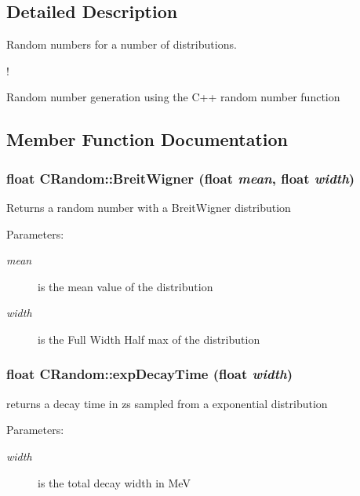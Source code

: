 \subsection{Detailed Description}
Random numbers for a number of distributions. 

!

Random number generation using the C++ random number function 



\subsection{Member Function Documentation}
\subsubsection{\setlength{\rightskip}{0pt plus 5cm}float CRandom::Breit\-Wigner (float {\em mean}, float {\em width})\hspace{0.3cm}{\tt  [static]}}\label{classCRandom_884f885e1cf081106f27a8ea25f14362}


Returns a random number with a Breit\-Wigner distribution \begin{Desc}
\item[Parameters:]
\begin{description}
\item[{\em mean}]is the mean value of the distribution \item[{\em width}]is the Full Width Half max of the distribution \end{description}
\end{Desc}
\subsubsection{\setlength{\rightskip}{0pt plus 5cm}float CRandom::exp\-Decay\-Time (float {\em width})\hspace{0.3cm}{\tt  [static]}}\label{classCRandom_26e937ca66f6b0b9163d6c63b8c902db}


returns a decay time in zs sampled from a exponential distribution \begin{Desc}
\item[Parameters:]
\begin{description}
\item[{\em width}]is the total decay width in Me\-V \end{description}
\end{Desc}
